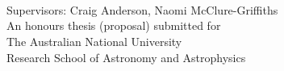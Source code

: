 
\begin{titlepage}
  \begin{center}
    \makeatletter
    {\Huge\textbf{\@title}} \\[.4cm]
    {\Huge\textbf{\thesisqualifier}} \\[.4cm]
    {\huge\textbf{\@author}} \\ [.4cm]
    {\large Supervisors: Craig Anderson, Naomi McClure-Griffiths} \\[7cm]
    \makeatother
    {\large An honours thesis (proposal) submitted for \\
    The Australian National University \\
    Research School of Astronomy and Astrophysics}\\[2cm]
    {\LARGE \thismonth}
  \end{center}
\end{titlepage}
